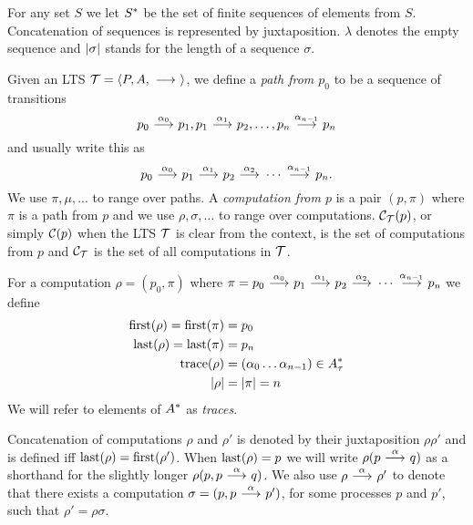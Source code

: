 \begin{definition}
    For any set $S$ we let $S^*$ be the set of finite sequences of elements
    from $S$. Concatenation of sequences is represented by juxtaposition.
    $\lambda$ denotes the empty sequence and $|\sigma|$ stands for the length of a
    sequence $\sigma$.

    Given an LTS $\mathcal{T} = \langle P,A,\ {\stackrel{{}}{\longrightarrow}}\  \rangle$, we define a
    \emph{path from $p_0$} to be a sequence of transitions
    \[
        p_0\ {\stackrel{{\alpha_0}}{\longrightarrow}}\ p_1,
        p_1\ {\stackrel{{\alpha_1}}{\longrightarrow}}\ p_2, \dots ,
        p_n\ {\stackrel{{\alpha_{n-1}}}{\longrightarrow}}\ p_n
    \]
    and usually write this as
    \[
        p_0 \ {\stackrel{{\alpha_0}}{\longrightarrow}}\  p_1
            \ {\stackrel{{\alpha_1}}{\longrightarrow}}\  p_2
            \ {\stackrel{{\alpha_2}}{\longrightarrow}}\  \cdots
            \ {\stackrel{{\alpha_{n-1}}}{\longrightarrow}}\ p_n.
    \]
    We use $\pi,\mu,...$ to range over paths.
    A \emph{computation from $p$} is a pair $(p,\pi)$ where $\pi$ is a path
    from $p$ and
    we use $\rho,\sigma,\dots$ to
    range over computations.
    $\mathcal{C}_{\mathcal{T}}(p)$,
    or simply $\mathcal{C}(p)$ when the LTS $\mathcal{T}$ is clear from the context,
    is the set of computations from $p$ and
    $\mathcal{C}_{\mathcal{T}}$ is the set of all computations in $\mathcal{T}$.

    For a computation $\rho = (p_0,\pi)$
    where $\pi = p_0 \ {\stackrel{{\alpha_0}}{\longrightarrow}}\  p_1 \ {\stackrel{{\alpha_1}}{\longrightarrow}}\  p_2 \ {\stackrel{{\alpha_2}}{\longrightarrow}}\ 
    \cdots \ {\stackrel{{\alpha_{n-1}}}{\longrightarrow}}\ p_n$ we define
    \begin{align*}
        \operatorname{first}(\rho) = \operatorname{first}(\pi) &= p_0 \\
        \operatorname{last}(\rho) = \operatorname{last}(\pi) &= p_n \\
        \operatorname{trace}(\rho) &= (\alpha_0\dots\alpha_{n-1}) \in A_\tau^* \\
        |\rho| &= |\pi| = n
    \end{align*}
    We will refer to  elements of $A^*$
    as \emph{traces}. 

    Concatenation of computations $\rho$ and $\rho'$
    is denoted by their juxtaposition
    $\rho\rho'$ and is defined iff $\operatorname{last}(\rho)=\operatorname{first}(\rho')$.
    When $\operatorname{last}(\rho) = p$ we will
    write $\rho(p\ {\stackrel{{\alpha}}{\longrightarrow}}\  q)$ as a shorthand for the slightly longer
    $\rho(p, p\ {\stackrel{{\alpha}}{\longrightarrow}}\  q)$.
    We also use $\rho \ {\stackrel{{\alpha}}{\longrightarrow}}\  \rho'$ to denote that
    there exists a computation
    $\sigma = (p, p \ {\stackrel{{\alpha}}{\longrightarrow}}\  p')$, for some processes $p$ and $p'$,
    such that $\rho' = \rho\sigma$.
\end{definition}

